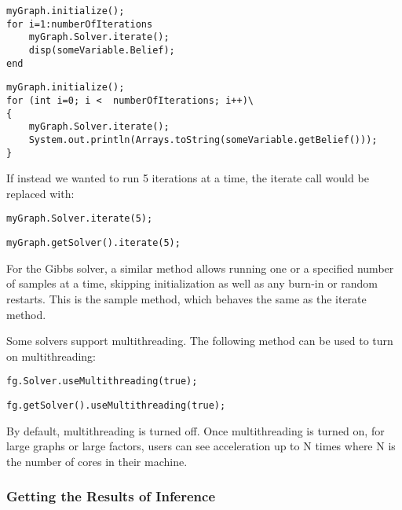 \ifmatlab

\begin{lstlisting}
myGraph.initialize();
for i=1:numberOfIterations
	myGraph.Solver.iterate();
	disp(someVariable.Belief);
end
\end{lstlisting}

\fi

\ifjava

\begin{lstlisting}
myGraph.initialize();
for (int i=0; i <  numberOfIterations; i++)\
{
	myGraph.Solver.iterate();
	System.out.println(Arrays.toString(someVariable.getBelief()));
}
\end{lstlisting}

\fi

If instead we wanted to run 5 iterations at a time, the iterate call would be replaced with:

\ifmatlab

\begin{lstlisting}
myGraph.Solver.iterate(5);
\end{lstlisting}

\fi

\ifjava
\begin{lstlisting}
myGraph.getSolver().iterate(5);
\end{lstlisting}

\fi

For the Gibbs solver, a similar method allows running one or a specified number of samples at a time, skipping initialization as well as any burn-in or random restarts.  This is the sample method, which behaves the same as the iterate method.


Some solvers support multithreading.  The following method can be used to turn on multithreading:

\ifmatlab
\begin{lstlisting}
fg.Solver.useMultithreading(true);
\end{lstlisting}
\fi

\ifjava
\begin{lstlisting}
fg.getSolver().useMultithreading(true);
\end{lstlisting}
\fi

By default, multithreading is turned off.  Once multithreading is turned on, for large graphs or large factors, users can see acceleration up to N times where N is the number of cores in their machine.


\subsubsection{Getting the Results of Inference}

